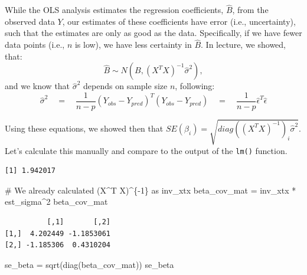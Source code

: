 \documentclass[
  letterpaper,
  DIV=11,
  numbers=noendperiod]{scrreprt}
\newenvironment{Shaded}{\begin{snugshade}}{\end{snugshade}}
\newcommand{\CommentTok}[1]{\textcolor[rgb]{0.37,0.37,0.37}{#1}}
\newcommand{\DecValTok}[1]{\textcolor[rgb]{0.68,0.00,0.00}{#1}}
\newcommand{\FunctionTok}[1]{\textcolor[rgb]{0.28,0.35,0.67}{#1}}
\newcommand{\NormalTok}[1]{\textcolor[rgb]{0.00,0.23,0.31}{#1}}
\newcommand{\OtherTok}[1]{\textcolor[rgb]{0.00,0.23,0.31}{#1}}
\newcommand{\SpecialCharTok}[1]{\textcolor[rgb]{0.37,0.37,0.37}{#1}}
\begin{document}
While the OLS analysis estimates the regression coefficients,
\(\hat{B}\), from the observed data \(Y\), our estimates of these
coefficients have error (i.e., uncertainty), such that the estimates are
only as good as the data. Specifically, if we have fewer data points
(i.e., \(n\) is low), we have less certainty in \(\hat{B}\). In lecture,
we showed, that:
\[\hat{B} \sim N \left( B, (X^TX)^{-1} \hat{\sigma}^2 \right), \] and we
know that \(\hat{\sigma}^2\) depends on sample size \(n\), following:
\[\hat{\sigma}^2 \quad = \quad \frac{1}{n-p} (Y_{obs} - Y_{pred})^T (Y_{obs} - Y_{pred}) \quad = \quad \frac{1}{n-p} \hat{\epsilon}^T \hat{\epsilon}\]

Using these equations, we showed then that
\(SE(\beta_i) = \sqrt{diag\left( (X^TX)^{-1} \right)_i \hat{\sigma}^2}\).
Let's calculate this manually and compare to the output of the
\texttt{lm()} function.

\begin{Shaded}
\end{Shaded}

\begin{verbatim}
[1] 1.942017
\end{verbatim}

\begin{Shaded}
\begin{Highlighting}[]
\CommentTok{\# We already calculated (X\^{}T X)\^{}\{{-}1\} as inv\_xtx}
\NormalTok{beta\_cov\_mat }\OtherTok{=}\NormalTok{ inv\_xtx }\SpecialCharTok{*}\NormalTok{ est\_sigma}\SpecialCharTok{\^{}}\DecValTok{2}
\NormalTok{beta\_cov\_mat}
\end{Highlighting}
\end{Shaded}

\begin{verbatim}
          [,1]       [,2]
[1,]  4.202449 -1.1853061
[2,] -1.185306  0.4310204
\end{verbatim}

\begin{Shaded}
\begin{Highlighting}[]
\NormalTok{se\_beta }\OtherTok{=} \FunctionTok{sqrt}\NormalTok{(}\FunctionTok{diag}\NormalTok{(beta\_cov\_mat))}
\NormalTok{se\_beta}
\end{Highlighting}
\end{Shaded}
\end{document}
